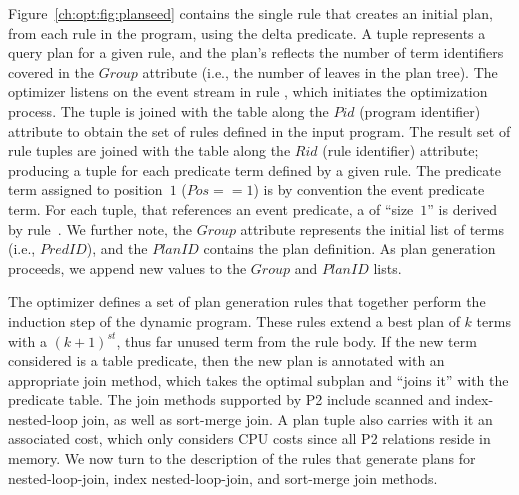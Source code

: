 Figure~\ref{ch:opt:fig:planseed} contains the single rule that creates an
initial plan, from each rule in the program, using the delta predicate.  A
 tuple represents a query plan for a given rule, and the plan's
 reflects the number of term identifiers covered in the $Group$
attribute (i.e., the number of leaves in the plan tree).  The optimizer listens
on the  event stream in rule , which
initiates the optimization process.  The  tuple is
joined with the  table along the $Pid$ (program identifier)
attribute to obtain the set of rules defined in the input program.  The result
set of rule tuples are joined with the  table along the
$Rid$ (rule identifier) attribute; producing a tuple for each predicate term
defined by a given rule.  The predicate term assigned to position~$1$ ($Pos ==
1$) is by convention the event predicate term.  For each 
tuple, that references an event predicate, a  of ``size~$1$'' is
derived by rule~.  We further note, the $Group$ attribute represents
the initial list of terms (i.e., $PredID$), and the $PlanID$ contains the plan
definition.  As plan generation proceeds, we append new values to the $Group$
and $PlanID$ lists.

The \OVERLOG optimizer defines a set of plan generation rules that together
perform the induction step of the dynamic program.  These rules extend a best
plan of $k$ terms with a $(k+1)^{st}$, thus far unused term from the rule body.
If the new term considered is a table predicate, then the new plan is annotated
with an appropriate join method, which takes the optimal subplan and ``joins
it'' with the predicate table.  The join methods supported by P2 include
scanned and index-nested-loop join, as well as sort-merge join.  A plan tuple
also carries with it an associated cost, which only considers CPU costs since
all P2 relations reside in memory.  We now turn to the description of the rules
that generate plans for nested-loop-join, index nested-loop-join, and
sort-merge join methods.

